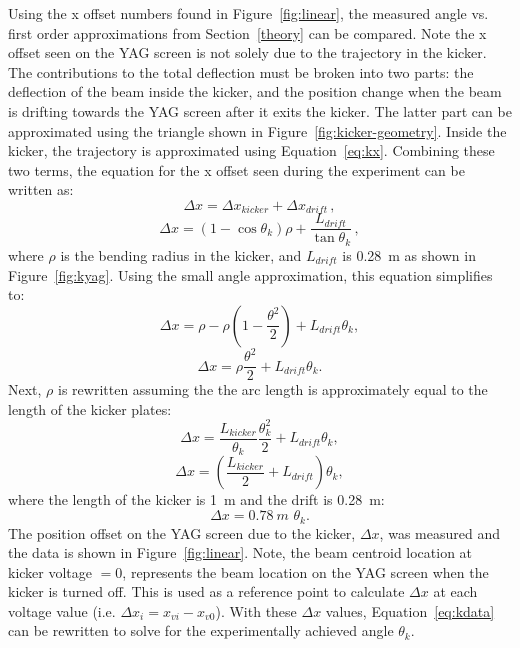 Using the x offset numbers found in Figure~\ref{fig:linear}, 
the measured angle vs. first order approximations from Section~\ref{theory} can be compared. 
Note the x offset seen on the YAG screen is not solely due to the trajectory in the kicker.
The contributions to the total deflection must be broken into two parts: the deflection of the beam inside the kicker, 
and the position change when the beam is drifting towards the YAG screen after it exits the kicker.
The latter part can be approximated using the triangle shown in Figure~\ref{fig:kicker-geometry}.
Inside the kicker, the trajectory is approximated using Equation~\ref{eq:kx}. 
Combining these two terms, the equation for the x offset seen during the experiment
can be written as:
\begin{equation}
	\Delta x = \Delta x_{kicker} + \Delta x_{drift}\, ,
\end{equation}
\begin{equation}
	\Delta x = \left(1-\cos\theta_{k}\right)\rho + \frac{L_{drift}}{\tan \theta_{k}}\, ,
	\label{eq:kdata}
\end{equation}
where $\rho$ is the bending radius in the kicker, and $L_{drift}$ is \SI{0.28}{m} as shown in Figure~\ref{fig:kyag}.
Using the small angle approximation, this equation simplifies to:
\begin{equation}
	\Delta x = \rho - \rho \left(1-\frac{\theta^2}{2}\right) + L_{drift} \theta_{k},
\end{equation}
\begin{equation}
	\Delta x = \rho \frac{\theta^2}{2} + L_{drift} \theta_{k}.
\end{equation}
Next, $\rho$ is rewritten assuming the the arc length is approximately equal 
to the length of the kicker plates:
\begin{equation}
	\Delta x = \frac{L_{kicker}}{\theta_{k}}\frac{\theta_{k}^2}{2} + L_{drift}\theta_{k},
\end{equation}
\begin{equation}
	\Delta x = \left(\frac{L_{kicker}}{2}+ L_{drift}\right)\theta_{k},
\end{equation}
where the length of the kicker is \SI{1}{m} and the drift is \SI{0.28}{m}:
\begin{equation}
	\Delta x = \SI{0.78}{m}\,\,\theta_{k}.
		\label{eq:kdx}
\end{equation}
The position offset on the YAG screen due to the kicker, $\Delta x$, 
was measured and the data is shown in Figure~\ref{fig:linear}. 
Note, the beam centroid location at kicker voltage $=0$, 
represents the beam location on the YAG screen when the kicker is turned off.
This is used as a reference point to calculate $\Delta x$ at each voltage value
(i.e. $\Delta x_i = x_{vi} - x_{v0}$).
With these $\Delta x$ values, Equation~\ref{eq:kdata} can be rewritten to 
solve for the experimentally achieved angle $\theta_{k}$.

